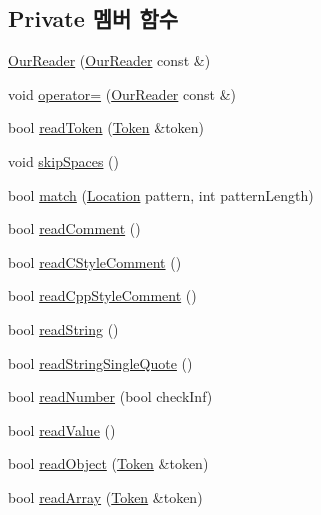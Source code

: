 \subsection*{Private 멤버 함수}
\begin{DoxyCompactItemize}
\item 
\hyperlink{class_json_1_1_our_reader_aee013005522c0d34d2e14962851487ac}{Our\+Reader} (\hyperlink{class_json_1_1_our_reader}{Our\+Reader} const \&)
\item 
void \hyperlink{class_json_1_1_our_reader_ad418de7c47bd3d0510888e22110b796e}{operator=} (\hyperlink{class_json_1_1_our_reader}{Our\+Reader} const \&)
\item 
bool \hyperlink{class_json_1_1_our_reader_a0d1e66da47fe2e85f5033c59326dfdc3}{read\+Token} (\hyperlink{class_json_1_1_our_reader_1_1_token}{Token} \&token)
\item 
void \hyperlink{class_json_1_1_our_reader_a6fbc6d58a4505e5ccadf330b57b17ca5}{skip\+Spaces} ()
\item 
bool \hyperlink{class_json_1_1_our_reader_a4a03f1b266def9b47c4fef35386557fb}{match} (\hyperlink{class_json_1_1_our_reader_a1bdc7bbc52ba87cae6b19746f2ee0189}{Location} pattern, int pattern\+Length)
\item 
bool \hyperlink{class_json_1_1_our_reader_a90f6bb9e55b2bc3d6c1880809495c222}{read\+Comment} ()
\item 
bool \hyperlink{class_json_1_1_our_reader_aba784b125baa1b62387e767b791f2f89}{read\+C\+Style\+Comment} ()
\item 
bool \hyperlink{class_json_1_1_our_reader_ae3de80671f0f997053e1c1c8a47a45c5}{read\+Cpp\+Style\+Comment} ()
\item 
bool \hyperlink{class_json_1_1_our_reader_a5d39b12671499ec5975f3bbc84b7d438}{read\+String} ()
\item 
bool \hyperlink{class_json_1_1_our_reader_ac78592defdc333faf56c6d0908758da3}{read\+String\+Single\+Quote} ()
\item 
bool \hyperlink{class_json_1_1_our_reader_aefcb9a78cc45870ccac2db2a66c8ec50}{read\+Number} (bool check\+Inf)
\item 
bool \hyperlink{class_json_1_1_our_reader_a1765d9670d191c89a57a22ea5591d35f}{read\+Value} ()
\item 
bool \hyperlink{class_json_1_1_our_reader_aea198f8101dba55099f4d8121a993530}{read\+Object} (\hyperlink{class_json_1_1_our_reader_1_1_token}{Token} \&token)
\item 
bool \hyperlink{class_json_1_1_our_reader_a0b9f58faf4212c6ecb5d8e2a1ac10257}{read\+Array} (\hyperlink{class_json_1_1_our_reader_1_1_token}{Token} \&token)

\end{DoxyCompactItemize}
